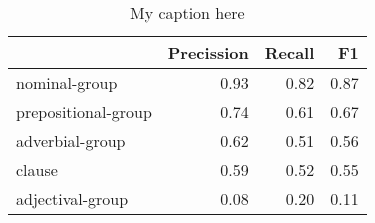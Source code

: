 \begin{table}[!ht]
\centering
\begin{tabular}{lrrr}
\toprule
{} &  Precission &  Recall &   F1 \\
\midrule
nominal-group       &        0.93 &    0.82 & 0.87 \\
prepositional-group &        0.74 &    0.61 & 0.67 \\
adverbial-group     &        0.62 &    0.51 & 0.56 \\
clause              &        0.59 &    0.52 & 0.55 \\
adjectival-group    &        0.08 &    0.20 & 0.11 \\
\bottomrule
\end{tabular}
\caption{My caption here}
\label{tab:unit-types-ocd-exact-F1}
\end{table}